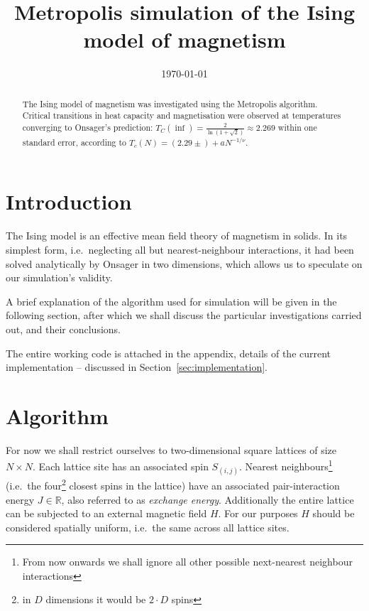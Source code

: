 \documentclass[12pt]{article}
\date{\today}
\title{Metropolis simulation of the Ising model of magnetism}
\begin{document}

\maketitle


\begin{abstract}
  The Ising model of magnetism was investigated using the Metropolis algorithm. Critical transitions in heat capacity and magnetisation were observed at temperatures converging to Onsager's prediction: \(T_C (\inf) = \frac{2}{\ln(1 + \sqrt{2})} \approx 2.269\) within one standard error, according to \(T_c(N) = (2.29 \pm )+ a N ^{-1/\nu}\). 
\end{abstract}


\section{Introduction}\label{sec:intro}
The Ising model is an effective mean field theory of magnetism in solids. In its simplest form, i.e.~neglecting all but nearest-neighbour interactions, it had been solved analytically by Onsager in two dimensions, which allows us to speculate on our simulation's validity. 

A brief explanation of the algorithm used for simulation will be given in the following section, after which we shall discuss the particular investigations carried out, and their conclusions.  

The entire working code is attached in the appendix, details of the current implementation -- discussed in Section~\ref{sec:implementation}. 

\section{Algorithm}\label{sec:algorithm}

For now we shall restrict ourselves to two-dimensional square lattices of size \(N \times N\). Each lattice site has an associated spin \(S_{(i, j)}\). Nearest neighbours\footnote{From now onwards we shall ignore all other possible next-nearest neighbour interactions} (i.e.~the four\footnote{in \(D\) dimensions it would be \(2 \cdot D\) spins} closest spins in the lattice) have an associated pair-interaction energy \(J \in \mathbb{R}\), also referred to as \emph{exchange energy}. Additionally the entire lattice can be subjected to an external magnetic field \(H\). For our purposes \(H\) should be considered spatially uniform, i.e.~the same across all lattice sites. 
\end{document}
